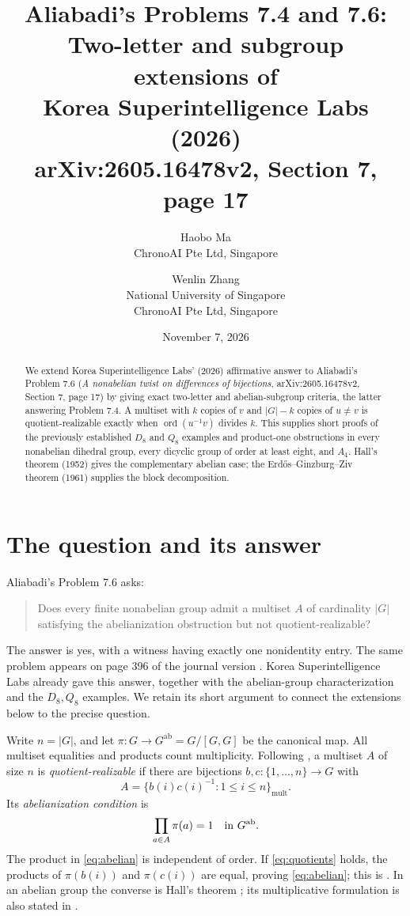 \documentclass[11pt]{article}
\title{Aliabadi's Problems 7.4 and 7.6:\\
Two-letter and subgroup extensions of\\
Korea Superintelligence Labs (2026)\\
\large arXiv:2605.16478v2, Section 7, page 17}
\author{Haobo Ma\\\small ChronoAI Pte Ltd, Singapore
\and Wenlin Zhang\\\small National University of Singapore\\
\small ChronoAI Pte Ltd, Singapore}
\date{November 7, 2026}
\newcommand{\ab}{\mathrm{ab}}
\newcommand{\mult}{\mathrm{mult}}
\begin{document}
\maketitle
\begin{abstract}
We extend Korea Superintelligence Labs' (2026) affirmative answer to
Aliabadi's Problem 7.6 (\emph{A nonabelian twist on differences of
bijections}, arXiv:2605.16478v2, Section 7, page 17) by giving exact
two-letter and abelian-subgroup criteria, the latter answering Problem 7.4.
A multiset with $k$ copies of $v$ and $|G|-k$ copies of $u\ne v$ is
quotient-realizable exactly when $\operatorname{ord}(u^{-1}v)$ divides $k$.
This supplies short proofs of the previously established $D_8$ and $Q_8$
examples and product-one obstructions in every nonabelian dihedral group,
every dicyclic group of order at least eight, and $A_4$.
Hall's theorem (1952) gives the complementary abelian case;
the Erd\H{o}s--Ginzburg--Ziv theorem (1961) supplies the block decomposition.
\end{abstract}

\section{The question and its answer}
Aliabadi's Problem 7.6 \cite[Section 7, page 17]{Aliabadi} asks:
\begin{quote}
Does every finite nonabelian group admit a multiset $A$ of cardinality $|G|$
satisfying the abelianization obstruction but not quotient-realizable?
\end{quote}
The answer is yes, with a witness having exactly one nonidentity entry.
The same problem appears on page 396 of the journal version \cite{Aliabadi}.
Korea Superintelligence Labs \cite[Theorem 3.2]{KSL} already gave this
answer, together with the abelian-group characterization and the $D_8,Q_8$
examples. We retain its short argument to connect the extensions below
to the precise question.

Write $n=|G|$, and let $\pi:G\to G^{\ab}=G/[G,G]$ be the canonical map.
All multiset equalities and products count multiplicity. Following
\cite[Definition 2.1]{Aliabadi}, a multiset $A$ of size $n$ is
\emph{quotient-realizable} if there are bijections
$b,c:\{1,\ldots,n\}\to G$ with
\begin{equation}\label{eq:quotients}
 A=\{b(i)c(i)^{-1}:1\leq i\leq n\}_{\mult}.
\end{equation}
Its \emph{abelianization condition} is
\begin{equation}\label{eq:abelian}
 \prod_{a\in A}\pi(a)=1\quad\hbox{in }G^{\ab}.
\end{equation}
The product in \eqref{eq:abelian} is independent of order. If
\eqref{eq:quotients} holds, the products of $\pi(b(i))$ and $\pi(c(i))$
are equal, proving \eqref{eq:abelian}; this is
\cite[Proposition 2.3]{Aliabadi}. In an abelian group the converse is
Hall's theorem \cite{Hall}; its multiplicative formulation is also stated
in \cite[Section 1]{Aliabadi}.
\end{document}
